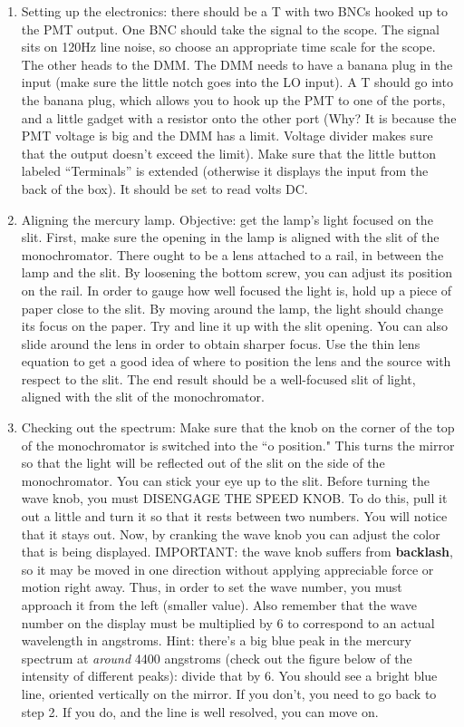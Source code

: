\documentclass{../lab}
\begin{document}
\begin{enumerate}
    \item Setting up the electronics: there should be a T with two BNCs hooked up to the PMT output. One BNC should take the signal to the scope. The signal sits on 120Hz line noise, so choose an appropriate time scale for the scope. The other heads to the DMM. The DMM needs to have a banana plug in the input (make sure the little notch goes into the LO input). A T should go into the banana plug, which allows you to hook up the PMT to one of the ports, and a little gadget with a resistor onto the other port (Why? It is because the PMT voltage is big and the DMM has a limit. Voltage divider makes sure that the output doesn't exceed the limit). Make sure that the little button labeled ``Terminals'' is extended (otherwise it displays the input from the back of the box). It should be set to read volts DC.

    \item Aligning the mercury lamp. Objective: get the lamp's light focused on the slit. First, make sure the opening in the lamp is aligned with the slit of the monochromator. There ought to be a lens attached to a rail, in between the lamp and the slit. By loosening the bottom screw, you can adjust its position on the rail. In order to gauge how well focused the light is, hold up a piece of paper close to the slit. By moving around the lamp, the light should change its focus on the paper. Try and line it up with the slit opening. You can also slide around the lens in order to obtain sharper focus. Use the thin lens equation to get a good idea of where to position the lens and the source with respect to the slit. The end result should be a well-focused slit of light, aligned with the slit of the monochromator.
    
    \item Checking out the spectrum:  Make sure that the knob on the corner of the top of the monochromator is switched into the ``o position." This turns the mirror so that the light will be reflected out of the slit on the side of the monochromator. You can stick your eye up to the slit. Before turning the wave knob, you must DISENGAGE THE SPEED KNOB. To do this, pull it out a little and turn it so that it rests between two numbers. You will notice that it stays out. Now, by cranking the wave knob you can adjust the color that is being displayed. IMPORTANT: the wave knob suffers from \textbf{backlash}, so it may be moved in one direction without applying appreciable force or motion right away. Thus, in order to set the wave number, you must approach it from the left (smaller value). Also remember that the wave number on the display must be multiplied by 6 to correspond to an actual wavelength in angstroms. Hint: there's a big blue peak in the mercury spectrum at \textit{around} 4400 angstroms (check out the figure below of the intensity of different peaks): divide that by 6. You should see a bright blue line, oriented vertically on the mirror. If you don't, you need to go back to step 2. If you do, and the line is well resolved, you can move on.
    

\end{enumerate}
\end{document}
